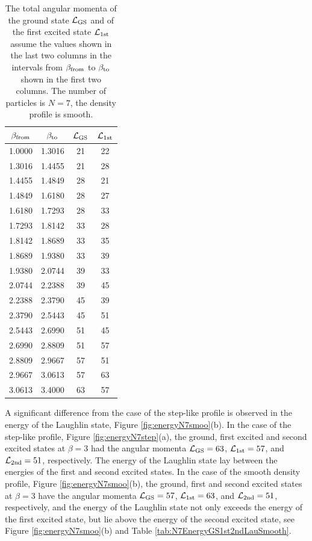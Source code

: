 \documentclass[aps,prb,10pt%
]{revtex4-2}
\begin{document}
\begin{table}[!ht]
\caption{The total angular momenta of the ground state ${\cal L}_{\rm GS}$ and of the first excited state ${\cal L}_{\rm 1st}$ assume the values shown in the last two columns in the intervals from $\beta_{\rm from}$ to $\beta_{\rm to}$ shown in the first two columns. The number of particles is  $N=7$, the density profile is smooth. \label{tab:N7LtotGS1stSmooth}}
\begin{tabular}{cccc}
$\beta_{\rm from}$ & $\beta_{\rm to}$   & ${\cal L}_{\rm GS}$   & ${\cal L}_{\rm 1st}$\\
\hline
   1.0000 &    1.3016 &   21 &   22 \\
   1.3016 &    1.4455 &   21 &   28 \\
   1.4455 &    1.4849 &   28 &   21 \\
   1.4849 &    1.6180 &   28 &   27 \\
   1.6180 &    1.7293 &   28 &   33 \\
   1.7293 &    1.8142 &   33 &   28 \\
   1.8142 &    1.8689 &   33 &   35 \\
   1.8689 &    1.9380 &   33 &   39 \\
   1.9380 &    2.0744 &   39 &   33 \\
   2.0744 &    2.2388 &   39 &   45 \\
   2.2388 &    2.3790 &   45 &   39 \\
   2.3790 &    2.5443 &   45 &   51 \\
   2.5443 &    2.6990 &   51 &   45 \\
   2.6990 &    2.8809 &   51 &   57 \\
   2.8809 &    2.9667 &   57 &   51 \\
   2.9667 &    3.0613 &   57 &   63 \\
   3.0613 &    3.4000 &   63 &   57 \\
\end{tabular}
\end{table}

A significant difference from the case of the step-like profile is observed in the energy of the Laughlin state, Figure \ref{fig:energyN7smoo}(b). In the case of the step-like profile, Figure \ref{fig:energyN7step}(a), the ground, first excited and second excited states at $\beta=3$ had the angular momenta ${\cal L}_{\rm GS}=63$, ${\cal L}_{\rm 1st}=57$, and ${\cal L}_{\rm 2nd}=51$, respectively. The energy of the Laughlin state lay between the energies of the first and second excited states. In the case of the smooth density profile, Figure \ref{fig:energyN7smoo}(b), the ground, first and second excited states at $\beta=3$ have the angular momenta ${\cal L}_{\rm GS}=57$, ${\cal L}_{\rm 1st}=63$, and ${\cal L}_{\rm 2nd}=51$, respectively, and the energy of the Laughlin state not only exceeds the energy of the first excited state, but lie above the energy of the second excited state, see Figure \ref{fig:energyN7smoo}(b) and Table \ref{tab:N7EnergyGS1st2ndLauSmooth}. 
\end{document}
